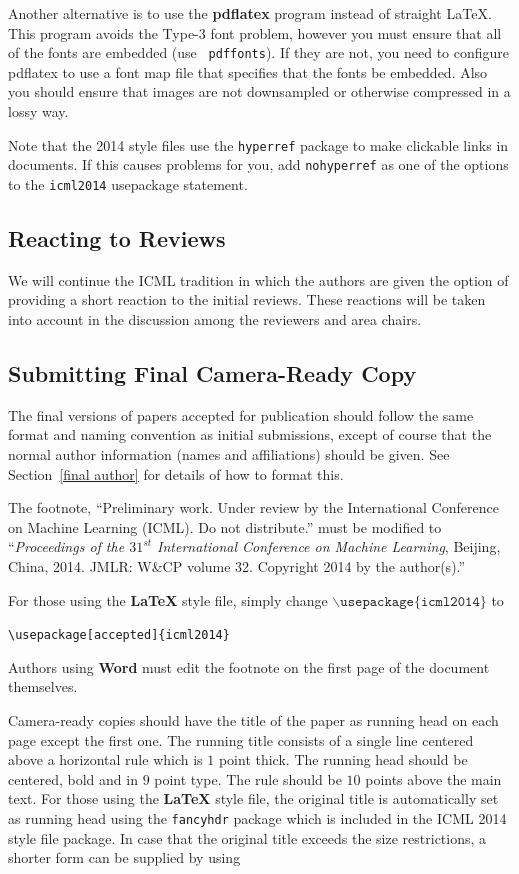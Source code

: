 \documentclass{article}
\begin{document}
Another alternative is to use the \textbf{pdflatex} program instead of
straight \LaTeX. This program avoids the Type-3 font problem, however
you must ensure that all of the fonts are embedded (use {\tt
pdffonts}). If they are not, you need to configure pdflatex to use a
font map file that specifies that the fonts be embedded. Also you
should ensure that images are not downsampled or otherwise compressed
in a lossy way.

Note that the 2014 style files use the {\tt hyperref} package to
make clickable links in documents.  If this causes problems for you,
add {\tt nohyperref} as one of the options to the {\tt icml2014}
usepackage statement.

\subsection{Reacting to Reviews}
We will continue the ICML tradition in which the authors are given the
option of providing a short reaction to the initial reviews. These
reactions will be taken into account in the discussion among the
reviewers and area chairs.

\subsection{Submitting Final Camera-Ready Copy}

The final versions of papers accepted for publication should follow the
same format and naming convention as initial submissions, except of
course that the normal author information (names and affiliations)
should be given.  See Section~\ref{final author} for details of how to
format this.

The footnote, ``Preliminary work.  Under review by the International
Conference on Machine Learning (ICML).  Do not distribute.'' must be
modified to ``\textit{Proceedings of the
$\mathit{31}^{st}$ International Conference on Machine Learning},
Beijing, China, 2014.  JMLR: W\&CP volume 32. 
Copyright 2014 by the author(s).''

For those using the \textbf{\LaTeX} style file, simply change
$\mathtt{\backslash usepackage\{icml2014\}}$ to 

\verb|\usepackage[accepted]{icml2014}|

\noindent
Authors using \textbf{Word} must edit the
footnote on the first page of the document themselves.

Camera-ready copies should have the title of the paper as running head
on each page except the first one.  The running title consists of a
single line centered above a horizontal rule which is $1$ point thick.
The running head should be centered, bold and in $9$ point type.  The
rule should be $10$ points above the main text.  For those using the
\textbf{\LaTeX} style file, the original title is automatically set as running
head using the {\tt fancyhdr} package which is included in the ICML
2014 style file package.  In case that the original title exceeds the
size restrictions, a shorter form can be supplied by using
\end{document}
